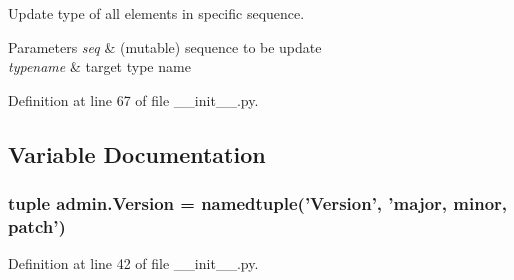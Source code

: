 Update type of all elements in specific sequence. 


\begin{DoxyParams}{Parameters}
{\em seq} & (mutable) sequence to be update \\
\hline
{\em typename} & target type name \\
\hline
\end{DoxyParams}


Definition at line 67 of file \-\_\-\-\_\-init\-\_\-\-\_\-.\-py.



\subsection{Variable Documentation}
\hypertarget{namespaceadmin_acbbc1dce90a9452383bd52c69b4a7489}{
\subsubsection[{Version}]{\setlength{\rightskip}{0pt plus 5cm}tuple admin.\-Version = namedtuple('Version', 'major, minor, patch')}}\label{namespaceadmin_acbbc1dce90a9452383bd52c69b4a7489}


Definition at line 42 of file \-\_\-\-\_\-init\-\_\-\-\_\-.\-py.


